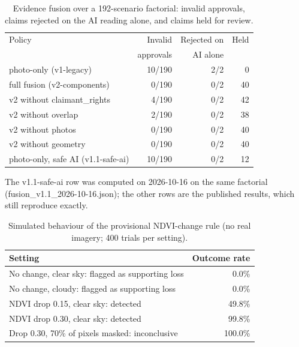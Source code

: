 \begin{table}[t]
\caption{Evidence fusion over a 192-scenario factorial: invalid approvals, claims rejected on the AI reading alone, and claims held for review.}
\label{tab:fusion}
\centering
\begin{tabular}{lrrr}
\hline
Policy & Invalid & Rejected on & Held \\
 & approvals & AI alone & \\
\hline
photo-only (v1-legacy) & 10/190 & 2/2 & 0 \\
full fusion (v2-components) & 0/190 & 0/2 & 40 \\
v2 without claimant\_rights & 4/190 & 0/2 & 42 \\
v2 without overlap & 2/190 & 0/2 & 38 \\
v2 without photos & 0/190 & 0/2 & 40 \\
v2 without geometry & 0/190 & 0/2 & 40 \\
photo-only, safe AI (v1.1-safe-ai) & 10/190 & 0/2 & 12 \\
\hline
\end{tabular}
\par\smallskip\footnotesize The v1.1-safe-ai row was computed on 2026-10-16 on the same factorial (fusion\_v1.1\_2026-10-16.json); the other rows are the published results, which still reproduce exactly.
\end{table}

\begin{table}[t]
\caption{Simulated behaviour of the provisional NDVI-change rule (no real imagery; 400 trials per setting).}
\label{tab:satellite}
\centering
\begin{tabular}{lr}
\hline
Setting & Outcome rate \\
\hline
No change, clear sky: flagged as supporting loss & 0.0\% \\
No change, cloudy: flagged as supporting loss & 0.0\% \\
NDVI drop 0.15, clear sky: detected & 49.8\% \\
NDVI drop 0.30, clear sky: detected & 99.8\% \\
Drop 0.30, 70\% of pixels masked: inconclusive & 100.0\% \\
\hline
\end{tabular}
\end{table}

